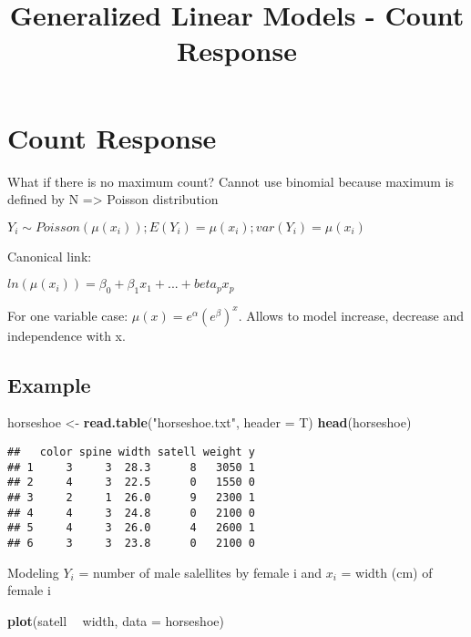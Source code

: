 \documentclass[]{article}
\title{Generalized Linear Models - Count Response}
\author{}
\date{}
\newenvironment{Shaded}{\begin{snugshade}}{\end{snugshade}}
\newcommand{\DataTypeTok}[1]{\textcolor[rgb]{0.13,0.29,0.53}{#1}}
\newcommand{\KeywordTok}[1]{\textcolor[rgb]{0.13,0.29,0.53}{\textbf{#1}}}
\newcommand{\NormalTok}[1]{#1}
\newcommand{\OperatorTok}[1]{\textcolor[rgb]{0.81,0.36,0.00}{\textbf{#1}}}
\newcommand{\StringTok}[1]{\textcolor[rgb]{0.31,0.60,0.02}{#1}}
\begin{document}
\maketitle

\hypertarget{count-response}{%
\section{Count Response}\label{count-response}}

What if there is no maximum count? Cannot use binomial because maximum
is defined by N =\textgreater{} Poisson distribution

\(Y_i \sim Poisson(\mu(x_i)); E(Y_i) = \mu(x_i); var(Y_i) = \mu(x_i)\)

Canonical link:

\(ln(\mu(x_i)) = \beta_0 + \beta_1 x_1 + ... + beta_p x_p\)

For one variable case: \(\mu(x) = e^\alpha (e^\beta)^x\). Allows to
model increase, decrease and independence with x.

\hypertarget{example}{%
\subsection{Example}\label{example}}

\begin{Shaded}
\begin{Highlighting}[]
\NormalTok{horseshoe <-}\StringTok{ }\KeywordTok{read.table}\NormalTok{(}\StringTok{"horseshoe.txt"}\NormalTok{, }\DataTypeTok{header =}\NormalTok{ T)}
\KeywordTok{head}\NormalTok{(horseshoe)}
\end{Highlighting}
\end{Shaded}

\begin{verbatim}
##   color spine width satell weight y
## 1     3     3  28.3      8   3050 1
## 2     4     3  22.5      0   1550 0
## 3     2     1  26.0      9   2300 1
## 4     4     3  24.8      0   2100 0
## 5     4     3  26.0      4   2600 1
## 6     3     3  23.8      0   2100 0
\end{verbatim}

Modeling \(Y_i\) = number of male salellites by female i and \(x_i\) =
width (cm) of female i

\begin{Shaded}
\begin{Highlighting}[]
\KeywordTok{plot}\NormalTok{(satell }\OperatorTok{~}\StringTok{ }\NormalTok{width, }\DataTypeTok{data =}\NormalTok{ horseshoe)}
\end{Highlighting}
\end{Shaded}
\end{document}
